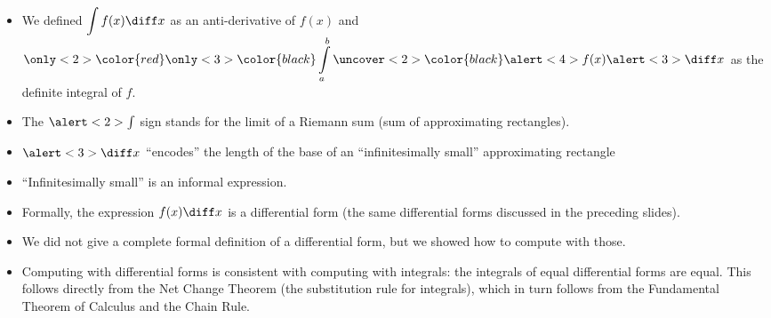 \begin{frame}
\begin{itemize}
\item<1-> We defined $\displaystyle\int f(x) \diff x$ as an anti-derivative of $f(x)$ and $\displaystyle \only<2>{\color{red} } \only<3>{ \color{black} } \int\limits^{b}_{a} \uncover<2>{\color{black}}  \alert<4>{f( x) }\alert<3>{ \diff x} $ as the definite integral of $f$.
\item<2-> The $\alert<2>{\int}$ sign stands for the \alert<2>{limit of a Riemann sum} (sum of \alert<3,4>{approximating rectangles}).
\item<3-> $\alert<3>{\diff x}$ ``encodes''  \alert<3>{the length of the base} of an ``\alert<5>{infinitesimally small}'' approximating rectangle
\item<5-> ``\alert<5>{Infinitesimally small}'' is an informal expression. 
\item<6-> Formally, the expression $f(x) \diff x$ is a differential form (the same differential forms discussed in the preceding slides).
\item<7-> We did not give a complete formal definition of a differential form, but we showed how to compute with those. 
\item<8-> Computing with differential forms is consistent with computing with integrals: the integrals of equal differential forms are equal.  This follows directly from the Net Change Theorem (the substitution rule for integrals), which in turn follows from the Fundamental Theorem of Calculus and the Chain Rule.
\end{itemize}
\end{frame}

